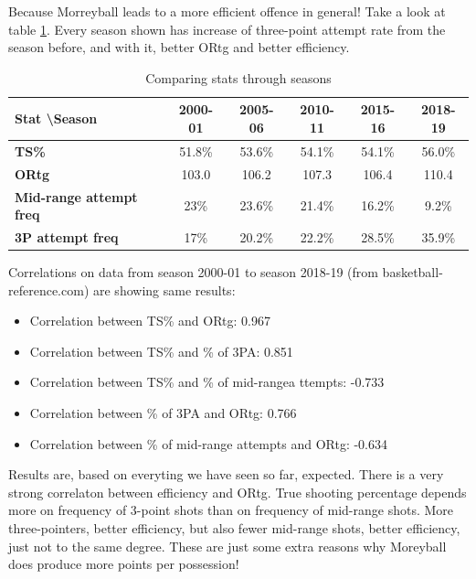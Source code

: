 \documentclass[a4paper]{article}
\begin{document}
Because Morreyball leads to a more efficient offence in general! Take a look at table \ref{tab:seasons_comp}. Every season shown has increase of three-point attempt rate from the season before, and with it, better ORtg and better efficiency.

\begin{table}[h!]
\begin{center}
\begin{tabular}{|l|c|c|c|c|c|} \hline
\textbf{Stat \textbackslash Season} & \textbf{2000-01} & \textbf{2005-06} & \textbf{2010-11} & \textbf{2015-16} & \textbf{2018-19} \\ \hline
\textbf{TS\%} & 51.8\% & 53.6\% & 54.1\% & 54.1\% & 56.0\% \\ \hline
\textbf{ORtg} & 103.0 & 106.2 & 107.3 & 106.4 & 110.4 \\ \hline
\textbf{Mid-range attempt freq} & 23\% & 23.6\% & 21.4\% & 16.2\% & 9.2\% \\ \hline
\textbf{3P attempt freq} & 17\% & 20.2\% & 22.2\% & 28.5\% & 35.9\% \\ \hline
\end{tabular}
\caption{Comparing stats through seasons}
\label{tab:seasons_comp}
\end{center}
\end{table}

Correlations on data from season 2000-01 to season 2018-19 (from basketball-reference.com) are showing same results:

\begin{itemize}
	\item Correlation between TS\% and ORtg: 0.967
	\item Correlation between TS\% and \% of 3PA: 0.851
	\item Correlation between TS\% and \% of mid-rangea ttempts: -0.733
	\item Correlation between \% of 3PA and ORtg: 0.766
	\item Correlation between \% of mid-range attempts and ORtg: -0.634
\end{itemize}

Results are, based on everyting we have seen so far, expected. There is a very strong correlaton between efficiency and ORtg. True shooting percentage depends more on frequency of 3-point shots than on frequency of mid-range shots. More three-pointers, better efficiency, but also fewer mid-range shots, better efficiency, just not to the same degree. These are just some extra reasons why Moreyball does produce more points per possession!
\end{document}
